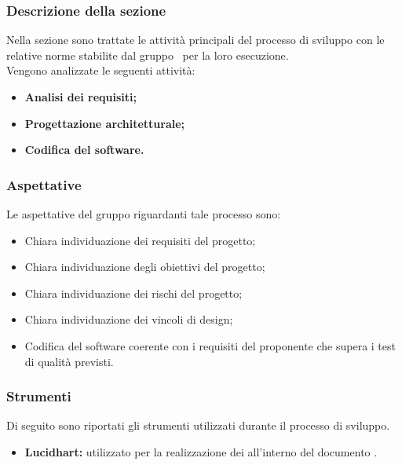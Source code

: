 \subsubsection{Descrizione della sezione} 
Nella sezione sono trattate le attività principali del processo di sviluppo con le relative norme stabilite dal gruppo \Gruppo\ per la loro esecuzione.\\
Vengono analizzate le seguenti attività:
\begin{itemize}
\item \textbf{Analisi dei requisiti;}
\item \textbf{Progettazione architetturale;}
\item \textbf{Codifica del software.}
\end{itemize}

\subsubsection{Aspettative}
Le aspettative del gruppo riguardanti tale processo sono:
\begin{itemize}
\item Chiara individuazione dei requisiti del progetto;
\item Chiara individuazione degli obiettivi del progetto;
\item Chiara individuazione dei rischi del progetto;
\item Chiara individuazione dei vincoli di design;
\item Codifica del software coerente con i requisiti del proponente che supera i test di qualità previsti.
\end{itemize}





\subsubsection{Strumenti}\label{PS_Strumenti}
Di seguito sono riportati gli strumenti utilizzati durante il processo di sviluppo.
\begin{itemize}
	\item \textbf{Lucidhart:} utilizzato per la realizzazione dei  all'interno del documento .
\end{itemize}
\newpage